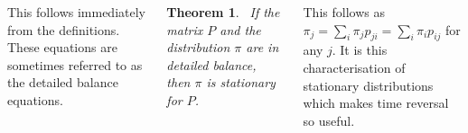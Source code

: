 \documentclass{tikzposter} %
\newtheorem{theorem}{Theorem}
\begin{document}
\begin{columns}
{{  This follows immediately from the definitions. These equations are sometimes referred to as the detailed balance equations.\\

  \begin{theorem}
  \ If the matrix $P$ and the distribution $\pi$ are in detailed balance, then $\pi$ is stationary for $P$.
  \end{theorem}
  \hphantom{}

  This follows as $\pi_{j} = \sum_{i} \pi_{j}p_{ji} = \sum_{i} \pi_{i} p_{ij}$ for any $j$. It is this characterisation of stationary distributions which makes time reversal so useful.
}
}
\end{columns}
\end{document}
